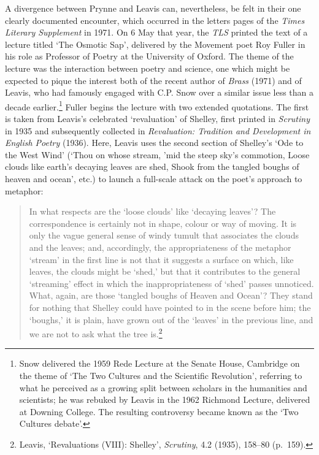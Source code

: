 \documentclass[]{article}
\begin{document}
A divergence between Prynne and Leavis can, nevertheless, be felt in
their one clearly documented encounter, which occurred in the letters
pages of the \emph{Times Literary Supplement} in 1971. On 6 May that
year, the \emph{TLS} printed the text of a lecture titled ‘The Osmotic
Sap’, delivered by the Movement poet Roy Fuller in his role as Professor
of Poetry at the University of Oxford. The theme of the lecture was the
interaction between poetry and science, one which might be expected to
pique the interest both of the recent author of \emph{Brass} (1971) and
of Leavis, who had famously engaged with C.P. Snow over a similar issue
less than a decade earlier.\footnote{Snow delivered the 1959 Rede
  Lecture at the Senate House, Cambridge on the theme of ‘The Two
  Cultures and the Scientific Revolution’, referring to what he
  perceived as a growing split between scholars in the humanities and
  scientists; he was rebuked by Leavis in the 1962 Richmond Lecture,
  delivered at Downing College. The resulting controversy became known
  as the ‘Two Cultures debate’.} Fuller begins the lecture with two
extended quotations. The first is taken from Leavis’s celebrated
‘revaluation’ of Shelley, first printed in \emph{Scrutiny} in 1935 and
subsequently collected in \emph{Revaluation: Tradition and Development
in English Poetry} (1936). Here, Leavis uses the second section of
Shelley’s ‘Ode to the West Wind’ (‘Thou on whose stream, ’mid the steep
sky’s commotion, \textbar{} Loose clouds like earth’s decaying leaves
are shed, \textbar{} Shook from the tangled boughs of heaven and ocean’,
etc.) to launch a full-scale attack on the poet’s approach to metaphor:

\begin{quote}
\singlespacing In what respects are the ‘loose clouds’ like ‘decaying
leaves’? The correspondence is certainly not in shape, colour or way of
moving. It is only the vague general sense of windy tumult that
associates the clouds and the leaves; and, accordingly, the
appropriateness of the metaphor ‘stream’ in the first line is not that
it suggests a surface on which, like leaves, the clouds might be ‘shed,’
but that it contributes to the general ‘streaming’ effect in which the
inappropriateness of ‘shed’ passes unnoticed. What, again, are those
‘tangled boughs of Heaven and Ocean’? They stand for nothing that
Shelley could have pointed to in the scene before him; the ‘boughs,’ it
is plain, have grown out of the ‘leaves’ in the previous line, and we
are not to ask what the tree is.\footnote{Leavis, ‘Revaluations (VIII):
  Shelley’, \emph{Scrutiny}, 4.2 (1935), 158–80 (p.~159).}
\end{quote}
\end{document}
